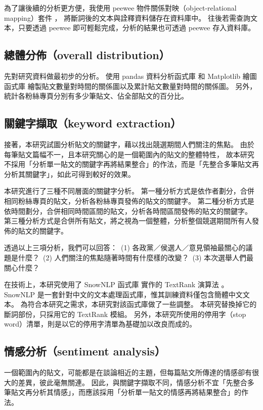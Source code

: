 \documentclass[letterpaper, 10pt, conference]{ieeeconf}   %
\begin{document}
\begin{CJK}{UTF8}{bsmi}
為了讓後續的分析更方便，我使用 peewee 物件關係對映（object-relational mapping）套件 \cite{c8}，%
將斷詞後的文本與詮釋資料儲存在資料庫中。%
往後若需查詢文本，只要透過 peewee 即可輕鬆完成，分析的結果也可透過 peewee 存入資料庫。%

\subsection*{總體分佈（overall distribution）}

先對研究資料做最初步的分析。%
使用 pandas 資料分析函式庫 \cite{c9} 和 Matplotlib 繪圖函式庫 \cite{c10} %
繪製貼文數量對時間的關係圖以及累計貼文數量對時間的關係圖。%
另外，統計各粉絲專頁分別有多少筆貼文、佔全部貼文的百分比。%

\subsection*{關鍵字擷取（keyword extraction）}

接著，本研究試圖分析貼文的關鍵字，藉以找出競選期間人們關注的焦點。%
由於每筆貼文篇幅不一，且本研究關心的是一個範圍內的貼文的整體特性，%
故本研究不採用「分析單一貼文的關鍵字再將結果整合」的作法，而是「先整合多筆貼文再分析其關鍵字」，如此可得到較好的效果。%

本研究進行了三種不同層面的關鍵字分析。%
第一種分析方式是依作者劃分，合併相同粉絲專頁的貼文，分析各粉絲專頁發佈的貼文的關鍵字。%
第二種分析方式是依時間劃分，合併相同時間區間的貼文，分析各時間區間發佈的貼文的關鍵字。%
第三種分析方式是合併所有貼文，將之視為一個整體，分析整個競選期間所有人發佈的貼文的關鍵字。%

透過以上三項分析，我們可以回答：%
\,(1) 各政黨／侯選人／意見領袖最關心的議題是什麼？%
\,(2) 人們關注的焦點隨著時間有什麼樣的改變？%
\,(3) 本次選舉人們最關心什麼？%

在技術上，本研究使用了 SnowNLP 函式庫 \cite{c11} 實作的 TextRank 演算法 \cite{c12}。%
SnowNLP 是一套針對中文的文本處理函式庫，惟其訓練資料僅包含簡體中文文本。%
為符合本研究之需求，本研究對該函式庫做了一些調整。%
本研究替換掉它的斷詞部份，只採用它的 TextRank 模組。%
另外，本研究所使用的停用字（stop word）清單，則是以它的停用字清單為基礎加以改良而成的。%

\subsection*{情感分析（sentiment analysis）}

一個範圍內的貼文，可能都是在談論相近的主題，但每篇貼文所傳達的情感卻有很大的差異，彼此毫無關連。%
因此，與關鍵字擷取不同，情感分析不宜「先整合多筆貼文再分析其情感」，而應該採用「分析單一貼文的情感再將結果整合」的作法。%


\end{CJK}
\end{document}
